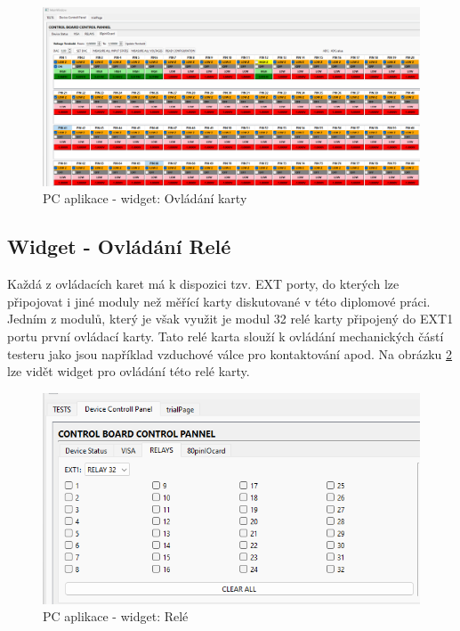 \begin{figure}[ht!]
    \centering
    \includegraphics[width = 1\textwidth]{obrazky/PC_APP_CONTROL_PANEL.png}
    \caption{PC aplikace - widget: Ovládání karty}
    \label{fig: PCAPP ovladani karty}
\end{figure}

\subsection{Widget - Ovládání Relé}
Každá z ovládacích karet má k dispozici tzv. EXT porty, do kterých lze připojovat i jiné moduly než měřící karty diskutované v této diplomové práci.
Jedním z modulů, který je však využit je modul 32 relé karty připojený do EXT1 portu první ovládací karty. Tato relé karta slouží k ovládání mechanických
částí testeru jako jsou například vzduchové válce pro kontaktování apod. Na obrázku \ref{fig: PCAPP rele} lze vidět widget pro ovládání této relé karty.

\begin{figure}[ht!]
    \centering
    \includegraphics[height = 0.25\textheight]{obrazky/PC_APP_RELAY.png}
    \caption{PC aplikace - widget:  Relé}
    \label{fig: PCAPP rele}
\end{figure}


